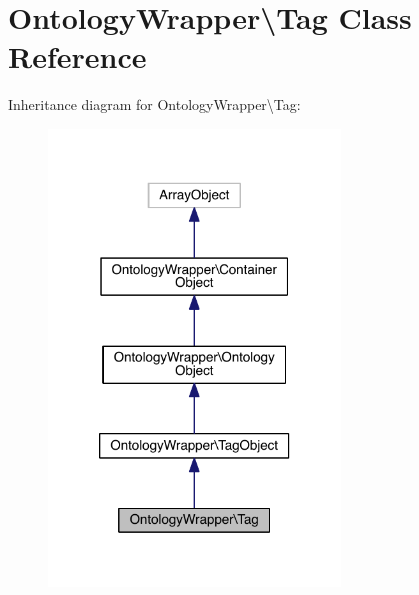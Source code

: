 \hypertarget{class_ontology_wrapper_1_1_tag}{\section{Ontology\-Wrapper\textbackslash{}Tag Class Reference}
\label{class_ontology_wrapper_1_1_tag}
}


Inheritance diagram for Ontology\-Wrapper\textbackslash{}Tag\-:
\nopagebreak
\begin{figure}[H]
\begin{center}
\leavevmode
\includegraphics[width=220pt]{class_ontology_wrapper_1_1_tag__inherit__graph}
\end{center}
\end{figure}


